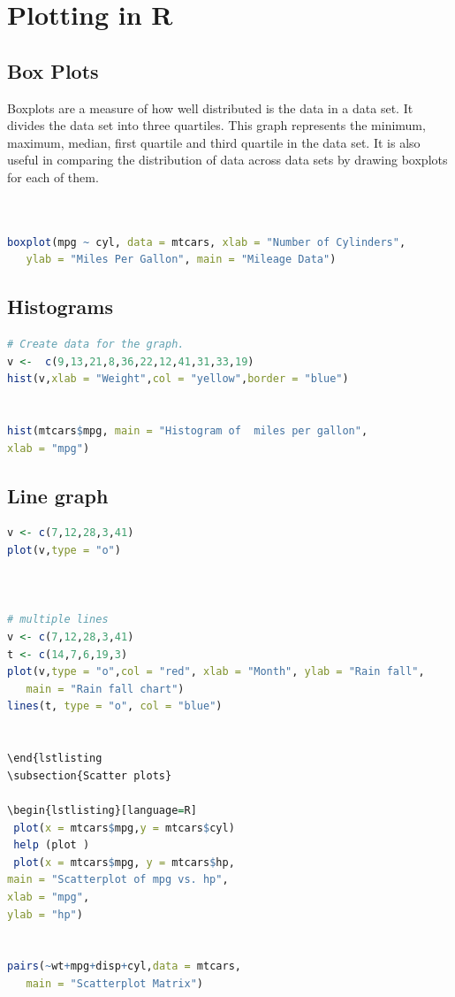 \documentclass["../Applied_probabillity _and_statistics_lab_KTU.tex"]{subfiles}
\begin{document}
 \section{Plotting in R}
\subsection{Box Plots}
Boxplots are a measure of how well distributed is the data in a data set. It divides the data set into three quartiles. This graph represents the minimum, maximum, median, first quartile and third quartile in the data set. It is also useful in comparing the distribution of data across data sets by drawing boxplots for each of them. 
\begin{lstlisting}[language=R]
 

boxplot(mpg ~ cyl, data = mtcars, xlab = "Number of Cylinders",
   ylab = "Miles Per Gallon", main = "Mileage Data")


\end{lstlisting}

\subsection{Histograms}
\begin{lstlisting}[language=R]
 # Create data for the graph.
v <-  c(9,13,21,8,36,22,12,41,31,33,19)
hist(v,xlab = "Weight",col = "yellow",border = "blue")


hist(mtcars$mpg, main = "Histogram of  miles per gallon",
xlab = "mpg")

\end{lstlisting}
\subsection{Line graph}
\begin{lstlisting}[language=R]
 v <- c(7,12,28,3,41)
plot(v,type = "o") 
 
 

# multiple lines
v <- c(7,12,28,3,41)
t <- c(14,7,6,19,3)
plot(v,type = "o",col = "red", xlab = "Month", ylab = "Rain fall", 
   main = "Rain fall chart")
lines(t, type = "o", col = "blue")


\end{lstlisting
\subsection{Scatter plots}

\begin{lstlisting}[language=R]
 plot(x = mtcars$mpg,y = mtcars$cyl)
 help (plot )
 plot(x = mtcars$mpg, y = mtcars$hp,
main = "Scatterplot of mpg vs. hp",
xlab = "mpg",
ylab = "hp")


pairs(~wt+mpg+disp+cyl,data = mtcars,
   main = "Scatterplot Matrix")


\end{lstlisting}
\end{document}
